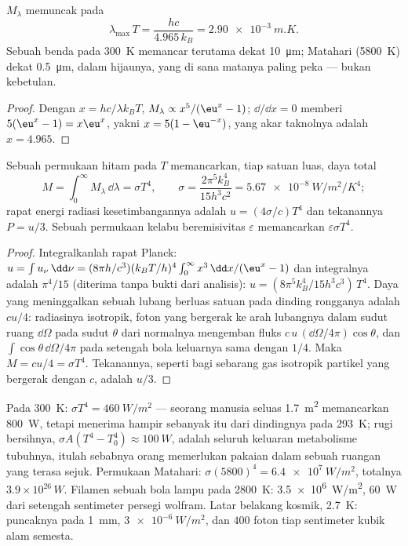 \begin{proposition}\label{prop:b2:thermal-radiation:wien}
 $M_\lambda$ memuncak pada
\[
\lambda_{\max}\,T = \frac{hc}{4.965\,k_B} = \qty{2.90e-3}{m.K} .
\]
Sebuah benda pada \qty{300}{K} memancar terutama dekat \qty{10}{\micro m}; Matahari
(\qty{5800}{K}) dekat \qty{0.5}{\micro m}, dalam hijaunya, yang di sana matanya
paling peka --- bukan kebetulan.
\end{proposition}

\begin{proof}
Dengan $x = hc/\lambda k_BT$, $M_\lambda \propto x^5/(\eu^x - 1)$; $\dd/\dd x = 0$
memberi $5(\eu^x - 1) = x\eu^x$, yakni $x = 5(1 - \eu^{-x})$, yang akar
taknolnya adalah $x = 4.965$.
\end{proof}

\begin{theorem}\label{thm:b2:thermal-radiation:stefan}
Sebuah permukaan hitam pada $T$ memancarkan, tiap satuan luas, daya total
\[
M = \int_0^\infty M_\lambda\,\dd\lambda = \sigma T^4, \qquad
\sigma = \frac{2\pi^5k_B^4}{15h^3c^2} = \qty{5.67e-8}{W/m^2/K^4} ;
\]
rapat energi radiasi kesetimbangannya adalah $u = (4\sigma/c)T^4$
dan tekanannya $P = u/3$. Sebuah permukaan kelabu beremisivitas $\varepsilon$
memancarkan $\varepsilon\sigma T^4$.
\end{theorem}

\begin{proof}
Integralkanlah rapat Planck: $u = \int u_\nu\,\dd\nu = (8\pi h/c^3)(k_BT/h)^4
\int_0^\infty x^3\,\dd x/(\eu^x - 1)$ dan integralnya adalah $\pi^4/15$
(diterima tanpa bukti dari analisis): $u = (8\pi^5k_B^4/15h^3c^3)\,T^4$. Daya
yang meninggalkan sebuah lubang berluas satuan pada dinding rongganya adalah $cu/4$:
radiasinya isotropik, foton yang bergerak ke arah lubangnya dalam
sudut ruang $\dd\Omega$ pada sudut $\theta$ dari normalnya mengemban
fluks $c\,u\,(\dd\Omega/4\pi)\cos\theta$, dan $\int\cos\theta\,\dd\Omega/4\pi$
pada setengah bola keluarnya sama dengan $1/4$. Maka $M = cu/4 = \sigma T^4$.
Tekanannya, seperti bagi sebarang gas isotropik partikel yang bergerak dengan $c$, adalah
$u/3$.
\end{proof}

\begin{example}\label{ex:b2:thermal-radiation:orders}
Pada \qty{300}{K}: $\sigma T^4 = \qty{460}{W/m^2}$ --- seorang manusia seluas
\qty{1.7}{m^2} memancarkan \qty{800}{W}, tetapi menerima hampir sebanyak itu dari
dindingnya pada \qty{293}{K}; rugi bersihnya, $\sigma A(T^4 - T_0^4) \approx
\qty{100}{W}$, adalah seluruh keluaran metabolisme tubuhnya, itulah sebabnya orang
memerlukan pakaian dalam sebuah ruangan yang terasa sejuk. Permukaan Matahari: $\sigma
(5800)^4 = \qty{6.4e7}{W/m^2}$, totalnya $3.9 \times 10^{26}\,\unit{W}$. Filamen
sebuah bola lampu pada \qty{2800}{K}: \qty{3.5e6}{W/m^2}, \qty{60}{W} dari setengah
sentimeter persegi wolfram. Latar belakang kosmik, \qty{2.7}{K}:
puncaknya pada \qty{1}{mm}, $\qty{3e-6}{W/m^2}$, dan $400$ foton tiap sentimeter
kubik alam semesta.
\end{example}

